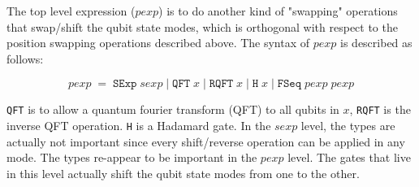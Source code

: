 The top level expression ($pexp$) is to do another kind of "swapping" operations that swap/shift the qubit state modes, which is orthogonal with respect to the position swapping operations described above. The syntax of $pexp$ is described as follows:

\[
pexp \;=\; \texttt{SExp}\;sexp \;|\; \texttt{QFT} \;x \;| \;\texttt{RQFT}\; x
               \;|\; \texttt{H}\; x \;|\; \texttt{FSeq}\;pexp\;pexp
\]

\texttt{QFT} is to allow a quantum fourier transform (QFT) to all qubits in $x$, \texttt{RQFT} is the inverse QFT operation. \texttt{H} is a Hadamard gate. In the $sexp$ level, the types are actually not important since every shift/reverse operation can be applied in any mode. The types re-appear to be important in the $pexp$ level. The gates that live in this level actually shift the qubit state modes from one to the other. 

